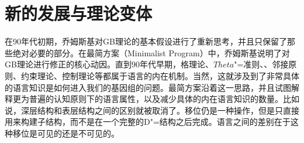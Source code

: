 \section{新的发展与理论变体}
\label{Abschnitt-neues-GB}

在90年代初期，乔姆斯基对GB理论的基本假设进行了重新思考，并且只保留了那些绝对必要的部分。在最简方案（Minimalist Program）中，乔姆斯基说明了对GB理论进行修正的核心动因\citep{Chomsky93b-u,Chomsky95a-u}。直到90年代早期，格理论、$Theta$"=准则、\xbartc、邻接原则、约束理论、控制理论等都属于语言的内在机制\citep[]{Richards2015a}。当然，这就涉及到了非常具体的语言知识是如何进入我们的基因组的问题。最简方案沿着这一思路，并且试图解释更为普遍的认知原则下的语言属性，以及减少具体的内在语言知识的数量。比如说，深层结构和表层结构之间的区别就被取消了。移位仍是一种操作，但是只直接用来构建子结构，而不是在一个完整的D"=结构之后完成。语言之间的差别在于这种移位是可见的还是不可见的。

